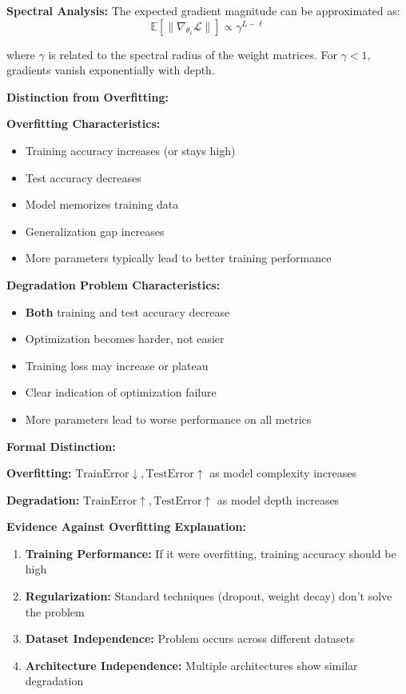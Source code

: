 \documentclass[12pt]{article}
\begin{document}
\begin{enumerate}[(a)]
{    \textbf{Spectral Analysis:}
    The expected gradient magnitude can be approximated as:
    $$\mathbb{E}[\|\nabla_{\theta_\ell} \mathcal{L}\|] \propto \gamma^{L-\ell}$$
    
    where $\gamma$ is related to the spectral radius of the weight matrices. For $\gamma < 1$, gradients vanish exponentially with depth.
    
    \textbf{Distinction from Overfitting:}
    
    \textbf{Overfitting Characteristics:}
    \begin{itemize}
        \item Training accuracy increases (or stays high)
        \item Test accuracy decreases  
        \item Model memorizes training data
        \item Generalization gap increases
        \item More parameters typically lead to better training performance
    \end{itemize}
    
    \textbf{Degradation Problem Characteristics:}
    \begin{itemize}
        \item \textbf{Both} training and test accuracy decrease
        \item Optimization becomes harder, not easier
        \item Training loss may increase or plateau
        \item Clear indication of optimization failure
        \item More parameters lead to worse performance on all metrics
    \end{itemize}
    
    \textbf{Formal Distinction:}
    
    \textbf{Overfitting:} $\text{TrainError} \downarrow, \text{TestError} \uparrow$ as model complexity increases
    
    \textbf{Degradation:} $\text{TrainError} \uparrow, \text{TestError} \uparrow$ as model depth increases
    
    \textbf{Evidence Against Overfitting Explanation:}
    \begin{enumerate}
        \item \textbf{Training Performance:} If it were overfitting, training accuracy should be high
        \item \textbf{Regularization:} Standard techniques (dropout, weight decay) don't solve the problem
        \item \textbf{Dataset Independence:} Problem occurs across different datasets
        \item \textbf{Architecture Independence:} Multiple architectures show similar degradation
    \end{enumerate}
    
}
\end{enumerate}
\end{document}

